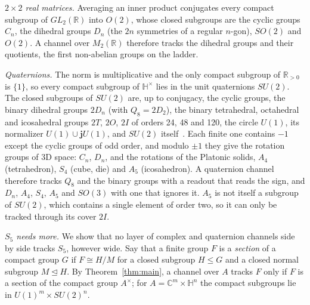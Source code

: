 \documentclass[aps,prx,reprint,superscriptaddress,longbibliography,nofootinbib,floatfix]{revtex4-2}
\newcommand{\HH}{\mathbb{H}}
\newcommand{\CC}{\mathbb{C}}
\newcommand{\RR}{\mathbb{R}}
\theoremstyle{plain}
\theoremstyle{definition}
\begin{document}
\emph{$2\times2$ real matrices.} Averaging an inner product conjugates every
compact subgroup of $GL_2(\RR)$ into $O(2)$, whose closed subgroups are
the cyclic groups $C_n$, the dihedral groups $D_n$ (the $2n$ symmetries of
a regular $n$-gon), $SO(2)$ and $O(2)$. A channel over $M_2(\RR)$ therefore
tracks the dihedral groups and their quotients, the first non-abelian
groups on the ladder.

\emph{Quaternions.} The norm is multiplicative and the only compact subgroup
of $\RR_{>0}$ is $\{1\}$, so every compact subgroup of $\HH^\times$ lies in
the unit quaternions $SU(2)$. The closed subgroups of $SU(2)$ are, up to
conjugacy, the cyclic groups, the binary dihedral groups $2D_n$ (with
$Q_8=2D_2$), the binary tetrahedral, octahedral and icosahedral groups
$2T$, $2O$, $2I$ of orders 24, 48 and 120, the circle $U(1)$, its normalizer
$U(1)\cup\mathbf jU(1)$, and $SU(2)$ itself~\cite{conway_smith,broecker}.
Each finite one contains $-1$ except the cyclic groups of odd order, and
modulo $\pm1$ they give the rotation groups of 3D space: $C_n$, $D_n$, and
the rotations of the Platonic solids, $A_4$ (tetrahedron), $S_4$ (cube,
die) and $A_5$ (icosahedron). A quaternion channel therefore tracks $Q_8$
and the binary groups with a readout that reads the sign, and $D_n$,
$A_4$, $S_4$, $A_5$ and $SO(3)$ with one that ignores it. $A_5$ is not
itself a subgroup of $SU(2)$, which contains a single element of order two,
so it can only be tracked through its cover $2I$.

\emph{$S_5$ needs more.} We show that no layer of complex and quaternion
channels side by side tracks $S_5$, however wide. Say that a finite group
$F$ is a \emph{section} of a compact group $G$ if $F\cong H/M$ for a closed
subgroup $H\le G$ and a closed normal subgroup $M\trianglelefteq H$. By
Theorem~\ref{thm:main}, a channel over $A$ tracks $F$ only if $F$ is a
section of the compact group $A^\times$; for $A=\CC^m\times\HH^n$ the
compact subgroups lie in $U(1)^m\times SU(2)^n$.
\end{document}
